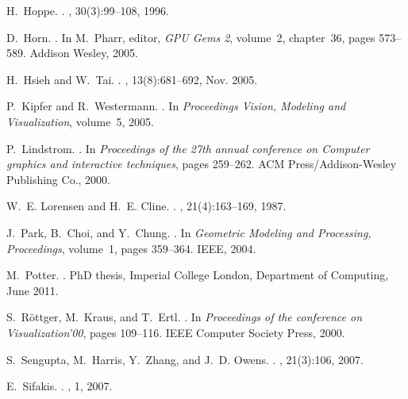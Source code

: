 \documentclass[10pt,journal,cspaper,compsoc]{IEEEtran}
\begin{document}
\begin{thebibliography}{10}
H.~Hoppe.
.
, 30(3):99--108, 1996.

D.~Horn.
.
\newblock In M.~Pharr, editor, {\em GPU Gems 2}, volume~2, chapter~36, pages
  573--589. Addison Wesley, 2005.

H.~Hsieh and W.~Tai.
.
, 13(8):681--692, Nov.
  2005.

P.~Kipfer and R.~Westermann.
.
\newblock In {\em Proceedings Vision, Modeling and Visualization}, volume~5,
  2005.

P.~Lindstrom.
.
\newblock In {\em Proceedings of the 27th annual conference on Computer
  graphics and interactive techniques}, pages 259--262. ACM
  Press/Addison-Wesley Publishing Co., 2000.

W.~E. Lorensen and H.~E. Cline.
.
, 21(4):163--169, 1987.

J.~Park, B.~Choi, and Y.~Chung.
.
\newblock In {\em Geometric Modeling and Processing, Proceedings}, volume~1,
  pages 359--364. IEEE, 2004.

M.~Potter.
.
\newblock PhD thesis, Imperial College London, Department of Computing, June
  2011.

S.~R\"{o}ttger, M.~Kraus, and T.~Ertl.
.
\newblock In {\em Proceedings of the conference on Visualization'00}, pages
  109--116. IEEE Computer Society Press, 2000.

S.~Sengupta, M.~Harris, Y.~Zhang, and J.~D. Owens.
.
, 21(3):106, 2007.

E.~Sifakis.
.
, 1, 2007.


\end{thebibliography}
\end{document}
